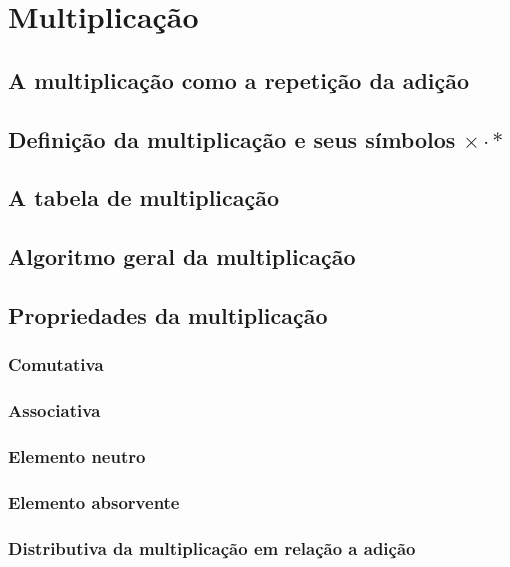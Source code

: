 \chapter[Multiplicação]{Multiplicação}

\section{A multiplicação como a repetição da adição}

\section{Definição da multiplicação e seus símbolos $ \times \cdot \ast $ }

\section{A tabela de multiplicação}

\section{Algoritmo geral da multiplicação}

\section{Propriedades da multiplicação}

\subsection{Comutativa}

\subsection{Associativa}

\subsection{Elemento neutro}

\subsection{Elemento absorvente}

\subsection{Distributiva da multiplicação em relação a adição}

